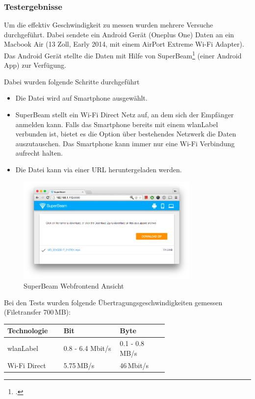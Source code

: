 \subsubsection{Testergebnisse}
Um die effektiv Geschwindigkeit zu messen wurden mehrere Versuche durchgeführt.
Dabei sendete ein Android Gerät (Oneplus One) Daten an ein Macbook Air (13 Zoll, Early 2014, mit einem AirPort Extreme Wi-Fi Adapter).
Das Android Gerät stellte die Daten mit Hilfe von SuperBeam\footcite{SuperBeam_WiFi_Direct_Share_Android_Apps_on_Google_Play_2015-05-22} (einer Android App) zur Verfügung.

Dabei wurden folgende Schritte durchgeführt
\begin{itemize}
	\item Die Datei wird auf Smartphone ausgewählt.
	\item SuperBeam stellt ein Wi-Fi Direct Netz auf, an dem sich der Empfänger anmelden kann. Falls das Smartphone bereits mit einem \gls{wlanLabel} verbunden ist, bietet es die Option über bestehendes Netzwerk die Daten auszutauschen. Das Smartphone kann immer nur eine Wi-Fi Verbindung aufrecht halten.
	\item Die Datei kann via einer URL heruntergeladen werden.
\end{itemize}

\begin{figure}[H]
	\centering
	\includegraphics[width=0.8\textwidth]{images/alternatives/superbeam_web.png}
	\caption{SuperBeam Webfrontend Ansicht}
\end{figure}

Bei den Tests wurden folgende Übertragungsgeschwindigkeiten gemessen (Filetransfer 700\,MB):
\begin{table}[H]
	\small\sffamily\renewcommand{\arraystretch}{1.4}
	\begin{tabular}{lp{0.35\linewidth}p{0.30\linewidth}}
		\toprule
		Technologie & Bit & Byte\\
		\midrule
		\gls{wlanLabel} & 0.8 - 6.4 Mbit/s & 0.1 - 0.8\,MB/s\\
		Wi-Fi Direct & 5.75\,MB/s & 46\,Mbit/s\\
		\bottomrule
	\end{tabular}
\end{table}

